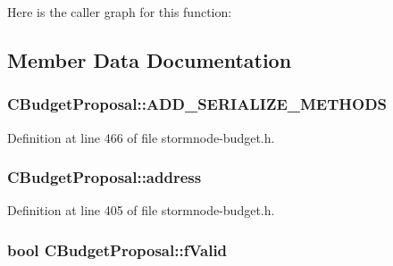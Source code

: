 Here is the caller graph for this function\+:




\subsection{Member Data Documentation}
\hypertarget{class_c_budget_proposal_ad35aca18a74a65dd6df2a04536253174}{}
\subsubsection[{A\+D\+D\+\_\+\+S\+E\+R\+I\+A\+L\+I\+Z\+E\+\_\+\+M\+E\+T\+H\+O\+D\+S}]{\setlength{\rightskip}{0pt plus 5cm}C\+Budget\+Proposal\+::\+A\+D\+D\+\_\+\+S\+E\+R\+I\+A\+L\+I\+Z\+E\+\_\+\+M\+E\+T\+H\+O\+D\+S}\label{class_c_budget_proposal_ad35aca18a74a65dd6df2a04536253174}


Definition at line 466 of file stormnode-\/budget.\+h.

\hypertarget{class_c_budget_proposal_abec3e0b5b46ac1a8aad65b4144b87782}{}
\subsubsection[{address}]{ C\+Budget\+Proposal\+::address}\label{class_c_budget_proposal_abec3e0b5b46ac1a8aad65b4144b87782}


Definition at line 405 of file stormnode-\/budget.\+h.

\hypertarget{class_c_budget_proposal_ab2222fd5e4fc51881d82b9c7dc6a0f10}{}
\subsubsection[{f\+Valid}]{\setlength{\rightskip}{0pt plus 5cm}bool C\+Budget\+Proposal\+::f\+Valid}\label{class_c_budget_proposal_ab2222fd5e4fc51881d82b9c7dc6a0f10}


